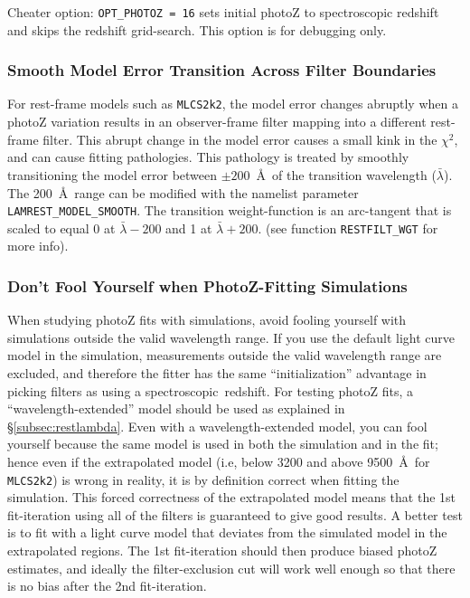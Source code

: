 \documentclass[12pt]{article}
\newcommand{\mlcs}{{\tt MLCS2k2}}
\newcommand{\spec}{spectroscopic}
\begin{document}
Cheater option: {\tt OPT\_PHOTOZ = 16} sets initial
photoZ to spectroscopic redshift and skips the redshift grid-search. 
This option is for debugging only.


   \subsubsection{Smooth Model Error Transition Across Filter Boundaries}
   \label{sss:smooth_model}

For rest-frame models such as \mlcs, the model error
changes abruptly when a photoZ variation results
in an observer-frame filter mapping into a different
rest-frame filter. This abrupt change in the model error
causes a small kink in the $\chi^2$, and can cause
fitting pathologies.   This pathology is treated by
smoothly transitioning the model error between
$\pm 200$~\AA\ of the transition wavelength ($\bar{\lambda}$).
The 200~\AA\ range can be modified with the namelist
parameter {\tt LAMREST\_MODEL\_SMOOTH}.
The transition weight-function is an arc-tangent that is scaled
to equal 0 at $\bar{\lambda}-200$ and 1 at $\bar{\lambda}+200$.
(see function {\tt RESTFILT\_WGT} for more info).

   \subsubsection{Don't Fool Yourself when PhotoZ-Fitting Simulations}
   \label{sss:photoz_fool}

When studying photoZ fits with simulations, 
avoid fooling yourself with simulations outside 
the valid wavelength range.
If you use the default light curve model in the simulation,
measurements outside the valid wavelength range
are excluded, and therefore the fitter has the same
``initialization'' advantage in picking filters 
as using a \spec\ redshift.  For testing photoZ fits,
a ``wavelength-extended'' model should be used
as explained in \S\ref{subsec:restlambda}.
Even with a wavelength-extended model, you can fool yourself
because the same model is used in both the simulation 
and in the fit; hence even if the extrapolated
model (i.e, below 3200 and above 9500~\AA\ for {\mlcs}) 
is wrong in reality, it is by definition correct when
fitting the simulation. This forced correctness of the
extrapolated model means that the 1st fit-iteration
using all of the filters is guaranteed to give
good results.  A better test is to fit with a light curve model
that deviates from the simulated model in the extrapolated
regions. The 1st fit-iteration should then produce
biased photoZ estimates, and ideally the filter-exclusion
cut will work well enough so that there is no bias
after the 2nd fit-iteration.
\end{document}
